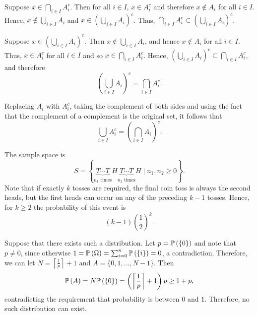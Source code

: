 \begin{ex}
  Suppose $x\in\bigcap_{i\in I}A_i^c$. Then for all $i\in I$, $x\in A_i^c$ and
  therefore $x\not\in A_i$ for all $i\in I$. Hence,
  $x\not\in \bigcup_{i\in I} A_i$ and $x\in\left(\bigcup_{i\in I} A_i\right)^c$.
  Thus, $\bigcap_{i\in I}A_i^c\subset \left(\bigcup_{i\in I} A_i\right)^c$.

  Suppose $x\in\left(\bigcup_{i\in I} A_i\right)^c$. Then
  $x\not\in\bigcup_{i\in I} A_i$, and hence $x\not\in A_i$ for all $i\in I$.
  Thus, $x\in A_i^c$ for all $i\in I$ and so $x\in\bigcap_{i\in I}A_i^c$. Hence,
  $\left(\bigcup_{i\in I} A_i\right)^c\subset\bigcap_{i\in I}A_i^c$, and
  therefore
  \[
    \left(\bigcup_{i\in I} A_i\right)^c=\bigcap_{i\in I}A_i^c.
  \]

  Replacing $A_i$ with $A_i^c$, taking the complement of both sides and using
  the fact that the complement of a complement is the original set, it follows
  that
  \[
    \bigcup_{i\in I} A_i^c=\left(\bigcap_{i\in I}A_i\right)^c.
  \]
\end{ex}

\begin{ex}
  The sample space is
  \[
    S=\left\{
    \underbrace{T\cdots T}_{n_1\text{ times}}
    H\underbrace{T\cdots T}_{n_2\text{ times}}H \mid n_1,n_2\geq0 \right\}.
  \]
  Note that if exactly $k$ tosses are required, the final coin toss is always
  the second heads, but the first heads can occur on any of the preceding $k-1$
  tosses. Hence, for $k\geq 2$ the probability of this event is
  \[
    (k-1)\left(\frac{1}{2}\right)^k.
  \]
\end{ex}

\begin{ex}
  Suppose that there exists such a distribution. Let $p=\P{\{0\}}$ and note that
  $p\neq 0$, since otherwise $1=\P{\Omega}=\sum_{i=0}^n\P{\{i\}}=0$, a
  contradiction. Therefore, we can let
  $N=\left\lceil\frac{1}{p}\right\rceil+1$ and $A=\{0, 1, \ldots, N-1\}$. Then
  \begin{align*}
    \P{A}
    =N\P{\{0\}}
    =\left(\left\lceil\frac{1}{p}\right\rceil+1\right)p
    \geq 1 + p,
  \end{align*}
  contradicting the requirement that probability is between $0$ and $1$.
  Therefore, no such distribution can exist.
\end{ex}

